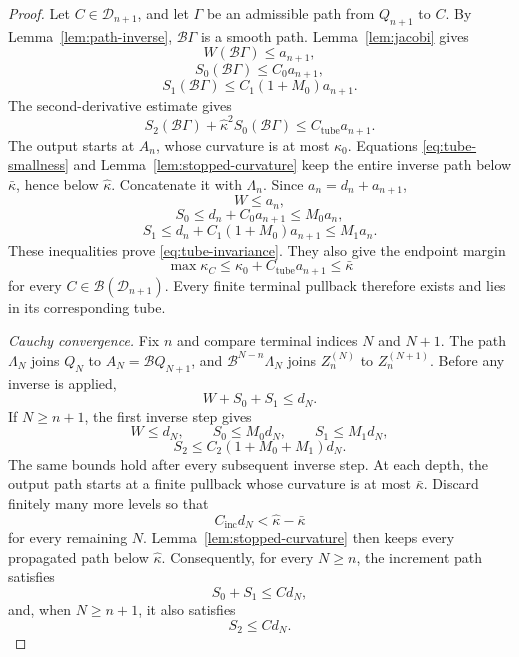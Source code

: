 \documentclass[11pt]{article}
\theoremstyle{remark}
\newcommand{\Bmap}{\mathcal B}
\begin{document}
\begin{proof}
Let \(C\in\mathcal D_{n+1}\), and let \(\Gamma\) be an admissible path
from \(Q_{n+1}\) to \(C\).  By Lemma~\ref{lem:path-inverse},
\(\Bmap\Gamma\) is a smooth path.  Lemma~\ref{lem:jacobi} gives
\[
   W(\Bmap\Gamma)\leq a_{n+1},
\]
\[
   S_0(\Bmap\Gamma)\leq C_0a_{n+1},
\]
\[
   S_1(\Bmap\Gamma)
      \leq C_1(1+M_0)a_{n+1}.
\]
The second-derivative estimate gives
\[
 S_2(\Bmap\Gamma)+\widehat\kappa^2S_0(\Bmap\Gamma)
 \leq C_{\mathrm{tube}}a_{n+1}.
\]
The output starts at \(A_n\), whose curvature is at most \(\kappa_0\).
Equations \eqref{eq:tube-smallness} and
Lemma~\ref{lem:stopped-curvature} keep the entire inverse path below
\(\bar\kappa\), hence below \(\widehat\kappa\).  Concatenate it with
\(\Lambda_n\).  Since \(a_n=d_n+a_{n+1}\),
\[
   W\leq a_n,
\]
\[
   S_0\leq d_n+C_0a_{n+1}\leq M_0a_n,
\]
\[
   S_1\leq d_n+C_1(1+M_0)a_{n+1}\leq M_1a_n.
\]
These inequalities prove \eqref{eq:tube-invariance}.  They also give the
endpoint margin
\begin{equation}\label{eq:endpoint-margin}
   \max\kappa_C
      \leq\kappa_0+C_{\mathrm{tube}}a_{n+1}
      \leq\bar\kappa
\end{equation}
for every \(C\in\Bmap(\mathcal D_{n+1})\).  Every finite terminal
pullback therefore exists and lies in its corresponding tube.

\emph{Cauchy convergence.}
Fix \(n\) and compare terminal indices \(N\) and \(N+1\).  The path
\(\Lambda_N\) joins \(Q_N\) to \(A_N=\Bmap Q_{N+1}\), and
\(\Bmap^{N-n}\Lambda_N\) joins \(Z_n^{(N)}\) to
\(Z_n^{(N+1)}\).  Before any inverse is applied,
\[
   W+S_0+S_1\leq d_N.
\]
If \(N\geq n+1\), the first inverse step gives
\[
   W\leq d_N,
   \qquad
   S_0\leq M_0d_N,
   \qquad
   S_1\leq M_1d_N,
\]
\[
   S_2\leq C_2(1+M_0+M_1)d_N.
\]
The same bounds hold after every subsequent inverse step.  At each depth,
the output path starts at a finite pullback whose curvature is at most
\(\bar\kappa\).  Discard finitely many more levels so that
\[
   C_{\mathrm{inc}}d_N<\widehat\kappa-\bar\kappa
\]
for every remaining \(N\).
Lemma~\ref{lem:stopped-curvature} then keeps every propagated path below
\(\widehat\kappa\).  Consequently, for every \(N\geq n\), the increment
path satisfies
\begin{equation}\label{eq:increment-low}
   S_0+S_1\leq Cd_N,
\end{equation}
and, when \(N\geq n+1\), it also satisfies
\begin{equation}\label{eq:increment}
   S_2\leq Cd_N.
\end{equation}


\end{proof}
\end{document}
